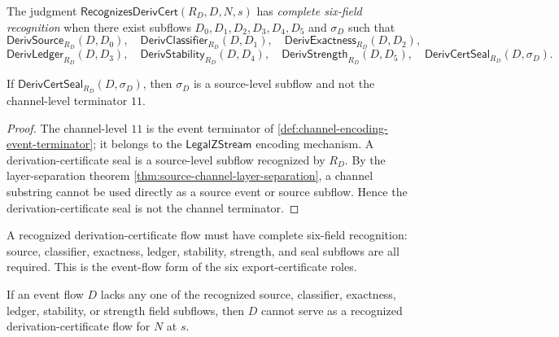 \begin{definition}
\label{def:derivcert-generated-complete-six-field-recognition}
The judgment $\mathsf{RecognizesDerivCert}(R_D,D,N,s)$ has \emph{complete six-field recognition} when there exist subflows $D_0,D_1,D_2,D_3,D_4,D_5$ and $\sigma_D$ such that
$$
  \mathsf{DerivSource}_{R_D}(D,D_0),\quad
  \mathsf{DerivClassifier}_{R_D}(D,D_1),\quad
  \mathsf{DerivExactness}_{R_D}(D,D_2),
$$
$$
  \mathsf{DerivLedger}_{R_D}(D,D_3),\quad
  \mathsf{DerivStability}_{R_D}(D,D_4),\quad
  \mathsf{DerivStrength}_{R_D}(D,D_5),\quad
  \mathsf{DerivCertSeal}_{R_D}(D,\sigma_D).
$$
\end{definition}

\begin{proposition}
\label{prop:derivcert-generated-seal-not-channel-terminator}
If $\mathsf{DerivCertSeal}_{R_D}(D,\sigma_D)$, then $\sigma_D$ is a source-level subflow and not the channel-level terminator $11$.
\end{proposition}

\begin{proof}
The channel-level $11$ is the event terminator of \autoref{def:channel-encoding-event-terminator}; it belongs to the $\mathsf{LegalZStream}$ encoding mechanism. A derivation-certificate seal is a source-level subflow recognized by $R_D$. By the layer-separation theorem \autoref{thm:source-channel-layer-separation}, a channel substring cannot be used directly as a source event or source subflow. Hence the derivation-certificate seal is not the channel terminator.
\end{proof}

\begin{principle}
\label{prin:derivcert-generated-no-derivcert-without-six-fields}
A recognized derivation-certificate flow must have complete six-field recognition: source, classifier, exactness, ledger, stability, strength, and seal subflows are all required. This is the event-flow form of the six export-certificate roles.
\end{principle}

\begin{theorem}
\label{thm:derivcert-generated-incomplete-does-not-support-export}
If an event flow $D$ lacks any one of the recognized source, classifier, exactness, ledger, stability, or strength field subflows, then $D$ cannot serve as a recognized derivation-certificate flow for $N$ at $s$.
\end{theorem}

